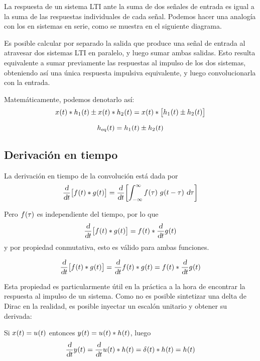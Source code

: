 La respuesta de un sistema LTI ante la suma de dos señales de entrada es igual a la suma de las respuestas individuales de cada señal.
Podemos hacer una analogía con los en sistemas en serie, como se muestra en el siguiente diagrama.

\begin{center}
    \def\svgwidth{0.8\linewidth}
    
\end{center}

Es posible calcular por separado la salida que produce una señal de entrada al atravesar dos sistemas LTI en paralelo, y luego sumar ambas salidas.
Esto resulta equivalente a sumar previamente las respuestas al impulso de los dos sistemas, obteniendo así una única respuesta impulsiva equivalente, y luego convolucionarla con la entrada.

Matemáticamente, podemos denotarlo así:
\[
    \fx[x]{t} * \fx[h_1]{t} \pm \fx[x]{t} * \fx[h_2]{t}
    = \fx[x]{t} * \inBrackets{\fx[h_1]{t} \pm \fx[h_2]{t}}
\]

\begin{mdframed}[style=PropertyFrame]
    \begin{prop}
    \end{prop}
    \[
        \fx[\sub{h}{eq}]{t} = \fx[h_1]{t} \pm \fx[h_2]{t}
    \]
\end{mdframed}

\subsection{Derivación en tiempo}

La derivación en tiempo de la convolución está dada por
\[
    \deriv{t} \inBrackets{\fx[f]{t} * \fx[g]{t}} = \deriv{t} \inBrackets{\convol[g]{f}}
\]

Pero $\fx[f]{\tau}$ es independiente del tiempo, por lo que
\[
    \deriv{t} \inBrackets{\fx[f]{t} * \fx[g]{t}}
    = \fx[f]{t} * \deriv{t} \fx[g]{t}
\]
y por propiedad conmutativa, esto es válido para ambas funciones.

\begin{mdframed}[style=PropertyFrame]
    \begin{prop}
    \end{prop}
    \[
        \deriv{t} \inBrackets{\fx[f]{t} * \fx[g]{t}}
        = \deriv{t} \fx[f]{t} * \fx[g]{t}
        = \fx[f]{t} * \deriv{t} \fx[g]{t}
    \]
\end{mdframed}

Esta propiedad es particularmente útil en la práctica a la hora de encontrar la respuesta al impulso de un sistema.
Como no es posible sintetizar una delta de Dirac en la realidad, es posible inyectar un escalón unitario y obtener su derivada:

Si $\fx[x]{t} = \fx[u]{t}$ entonces $\fx[y]{t} = \fx[u]{t} * \fx[h]{t}$, luego
\[
    \deriv{t} \fx[y]{t} = \deriv{t} \fx[u]{t} * \fx[h]{t} = \fx[\delta]{t} * \fx[h]{t} = \fx[h]{t}
\]
